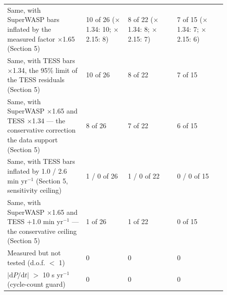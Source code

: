\documentclass{aa}
\begin{document}
\begin{table}
\begin{tabular}{p{0.32\linewidth} p{0.17\linewidth} p{0.20\linewidth} p{0.20\linewidth}}
Same, with SuperWASP bars inflated by the measured factor $\times$1.65 (Section 5) & 10 of 26 ($\times$1.34: 10; $\times$2.15: 8) & 8 of 22 ($\times$1.34: 8; $\times$2.15: 7) & 7 of 15 ($\times$1.34: 7; $\times$2.15: 6)\\
Same, with TESS bars $\times$1.34, the 95\% limit of the TESS residuals (Section 5) & 10 of 26 & 8 of 22 & 7 of 15\\
Same, with SuperWASP $\times$1.65 and TESS $\times$1.34 --- the conservative correction the data support (Section 5) & 8 of 26 & 7 of 22 & 6 of 15\\
Same, with TESS bars inflated by 1.0 / 2.6 min yr$^{-1}$ (Section 5, sensitivity ceiling) & 1 / 0 of 26 & 1 / 0 of 22 & 0 / 0 of 15\\
Same, with SuperWASP $\times$1.65 and TESS +1.0 min yr$^{-1}$ --- the conservative ceiling (Section 5) & 1 of 26 & 1 of 22 & 0 of 15\\
Measured but not tested (d.o.f. $<$ 1) & 0 & 0 & 0\\
$|\mathrm{d}P/\mathrm{d}t|$ $>$ 10 s yr$^{-1}$ (cycle-count guard) & 0 & 0 & 0\\
\hline
\end{tabular}
\end{table}
\end{document}
